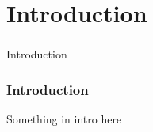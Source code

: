 \section[Introduction]{Introduction}

\begin{frame}
  \frametitle{}
  \begin{center}
    {\Huge Introduction}
  \end{center}
\end{frame}
\note{
}

\begin{frame}
    \frametitle{Introduction}
   Something in intro here
\end{frame}





